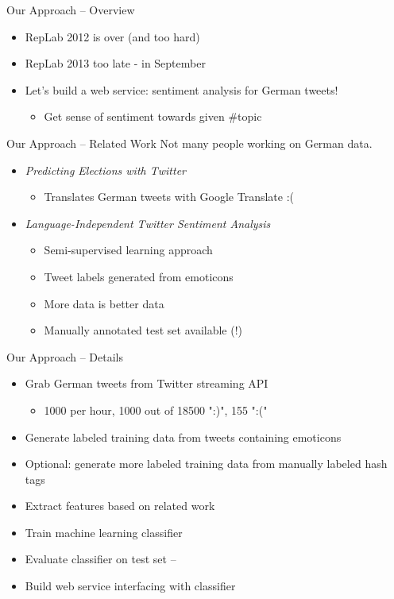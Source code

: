 \documentclass[12pt,a4paper]{beamer}
\begin{document}
\begin{frame}{Our Approach -- Overview}
\begin{itemize}
\item RepLab 2012 is over (and too hard)
\item RepLab 2013 too late - in September
\item Let's build a web service: sentiment analysis for German tweets!
  \begin{itemize}
  \item Get sense of sentiment towards given \#topic
  \end{itemize}
\end{itemize}
\end{frame}



\begin{frame}{Our Approach -- Related Work}
Not many people working on German data.
\begin{itemize}
\item \textit{Predicting Elections with Twitter} \cite{elections}
  \begin{itemize}
  \item Translates German tweets with Google Translate :(
  \end{itemize}
\item \textit{Language-Independent Twitter Sentiment Analysis} \cite{narr}
  \begin{itemize}
  \item Semi-supervised learning approach
  \item Tweet labels generated from emoticons
  \item More data is better data
  \item Manually annotated test set available (!)
  \end{itemize}
\end{itemize}
\end{frame}


\begin{frame}{Our Approach -- Details}
\begin{itemize}
\item Grab German tweets from Twitter streaming API
  \begin{itemize}
  \item 1000 per hour, 1000 out of 18500 ":)", 155 ":("
  \end{itemize}
\item Generate labeled training data from tweets containing emoticons \cite{goodbadomg} \cite{emotiontokens} \cite{sentimentanalysistwitter}
\item Optional: generate more labeled training data from manually labeled hash tags \cite{goodbadomg}  
\item Extract features based on related work
\item Train machine learning classifier
\item Evaluate classifier on test set -- \cite{narr}
\item Build web service interfacing with classifier
\end{itemize}
\end{frame}
\end{document}
